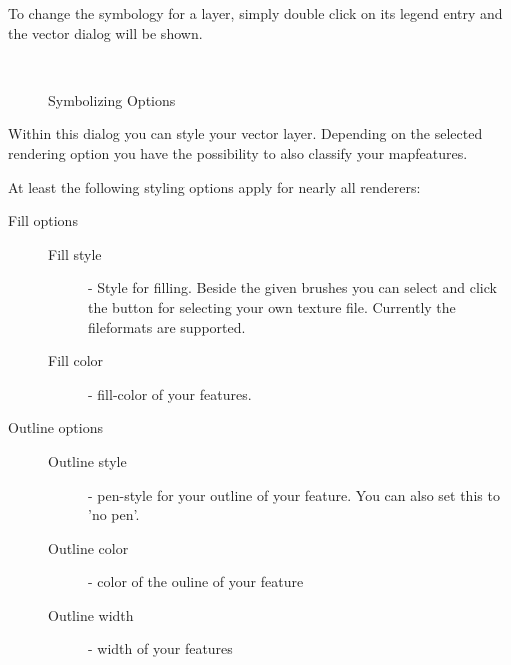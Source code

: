 To change the symbology for a layer, simply double click on its legend 
entry and the vector  dialog will be 
shown.

\begin{figure}[h]
\centering
\caption{Symbolizing Options \nixcaption}
   \goodgap
   \\
   \goodgap
\end{figure}


 \label{sec:style_options} 
Within this dialog you can style your vector layer. Depending on the selected
rendering option you have the possibility to also classify your mapfeatures.

At least the following styling options apply for nearly all renderers:
\begin{description}
\item[Fill options]
\begin{description}
 \item[Fill style] - Style for filling. Beside the given brushes you can
 select  and click the \browsebutton
 button for selecting your own texture file. Currently the fileformats
  are supported.
 \item[Fill color] - fill-color of your features.
\end{description}
\item[Outline options]
\begin{description}
 \item[Outline style] - pen-style for your outline of your feature. You can
 also set this to 'no pen'.
 \item[Outline color] - color of the ouline of your feature
 \item[Outline width] - width of your features
\end{description}
\end{description}

